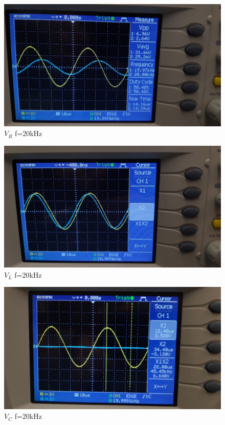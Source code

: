 \documentclass[12pt]{article}
\begin{document}
    \begin{figure}[!h]
        \centering
        \includegraphics[scale=0.2]{media/f2vr.jpg}
        \caption{$V_R$ f=20kHz}
    \end{figure}
    \begin{figure}[!h]
        \centering
        \includegraphics[scale=0.2]{media/f2vl.jpg}
        \caption{$V_L$ f=20kHz}
    \end{figure}
    \begin{figure}[!h]
        \centering
        \includegraphics[scale=0.2]{media/f2vc.jpg}
        \caption{$V_C$ f=20kHz}
    \end{figure}
\end{document}
